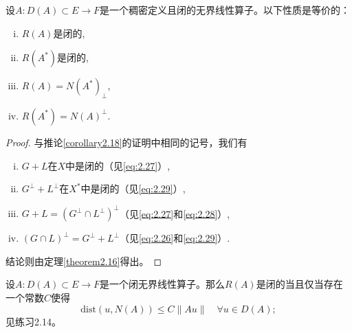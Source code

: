 \begin{theorem}\label{theorem2.19_again}
设$A:D(A) \subset E \to F$是一个稠密定义且闭的无界线性算子。以下性质是等价的：
\begin{enumerate}[(i)]
    \item $R(A)$是闭的,
    \item $R(A^*)$是闭的,
    \item $R(A) = N(A^*)_\perp$,
    \item $R(A^*) = N(A)^\perp$.
\end{enumerate}
\end{theorem}
\begin{proof}
与推论\ref{corollary2.18}的证明中相同的记号，我们有
\begin{enumerate}[(i)]
    \item $G+L$在$X$中是闭的（见\eqref{eq:2.27}）,
    \item $G^\perp+L^\perp$在$X^*$中是闭的（见\eqref{eq:2.29}）,
    \item $G+L = (G^\perp \cap L^\perp)^\perp$（见\eqref{eq:2.27}和\eqref{eq:2.28}）,
    \item $(G \cap L)^\perp = G^\perp+L^\perp$（见\eqref{eq:2.26}和\eqref{eq:2.29}）.
\end{enumerate}
结论则由定理\ref{theorem2.16}得出。
\end{proof}

\begin{remark}
设$A:D(A) \subset E \to F$是一个闭无界线性算子。那么$R(A)$是闭的当且仅当存在一个常数$C$使得
\[ \text{dist}(u, N(A)) \leq C\|Au\| \quad \forall u \in D(A); \]
见练习2.14。
\end{remark}

